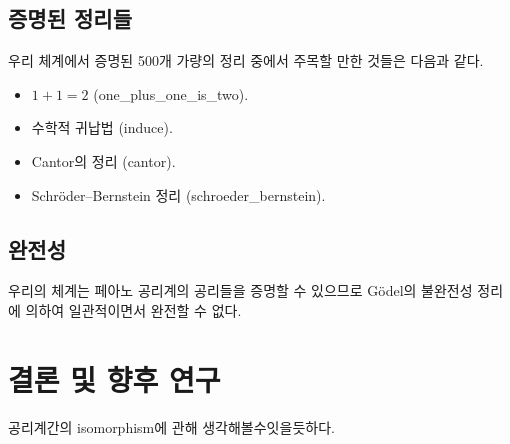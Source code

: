 \documentclass[10pt,twocolumn]{article}
\theoremstyle{definition}
\begin{document}
\subsection{증명된 정리들}

우리 체계에서 증명된 500개 가량의 정리 중에서 주목할 만한 것들은 다음과 같다.

\begin{itemize}
	\item $1+1=2$ (\textsf{one\_plus\_one\_is\_two}).
	\item 수학적 귀납법 (\textsf{induce}).
	\item Cantor의 정리 (\textsf{cantor}).
	\item Schr\"oder--Bernstein 정리 (\textsf{schroeder\_bernstein}).
\end{itemize}

\subsection{완전성}

우리의 체계는 페아노 공리계의 공리들을 증명할 수 있으므로 G\"odel의 불완전성 정리에 의하여 일관적이면서 완전할 수 없다.

\section{결론 및 향후 연구}

공리계간의 isomorphism에 관해 생각해볼수잇을듯하다.


\end{document}
